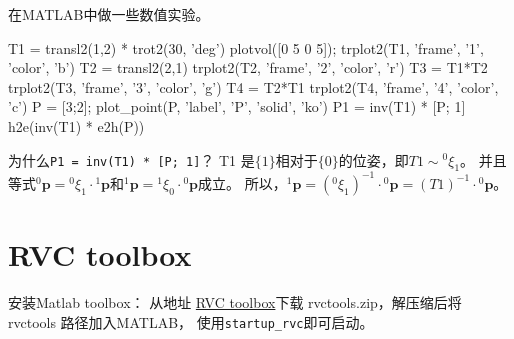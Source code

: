 \documentclass[UTF8,a4paper,10pt]{ctexart}
\begin{document}
在MATLAB中做一些数值实验。
\begin{matlab}
  T1 = transl2(1,2) * trot2(30, 'deg')
  plotvol([0 5 0 5]); trplot2(T1, 'frame', '1', 'color', 'b')
  T2 = transl2(2,1)
  trplot2(T2, 'frame', '2', 'color', 'r')
  T3 = T1*T2
  trplot2(T3, 'frame', '3', 'color', 'g')
  T4 = T2*T1
  trplot2(T4, 'frame', '4', 'color', 'c')
  P = [3;2];
  plot_point(P, 'label', 'P', 'solid', 'ko')
  P1 = inv(T1) * [P; 1]
  h2e(inv(T1) * e2h(P))
\end{matlab}
为什么\verb|P1 = inv(T1) * [P; 1]|？
T1 是$\{1\}$相对于$\{0\}$的位姿，即$T1\sim{}^0\xi_1$。
并且等式${}^0\mathbf{p}={}^0\xi_1\cdot{}^1\mathbf{p}$和${}^1\mathbf{p}={}^1\xi_0\cdot{}^0\mathbf{p}$成立。
所以，${}^1\mathbf{p}=({}^0\xi_1)^{-1}\cdot{}^0\mathbf{p}=(T1)^{-1}\cdot{}^0\mathbf{p}$。



 



















\appendix
\section{RVC toolbox}
安装Matlab toolbox：
从地址 \href{https://petercorke.com/RVC}{RVC toolbox}下载 rvctools.zip，解压缩后将 rvctools 路径加入MATLAB，
使用\verb|startup_rvc|即可启动。



\end{document}
